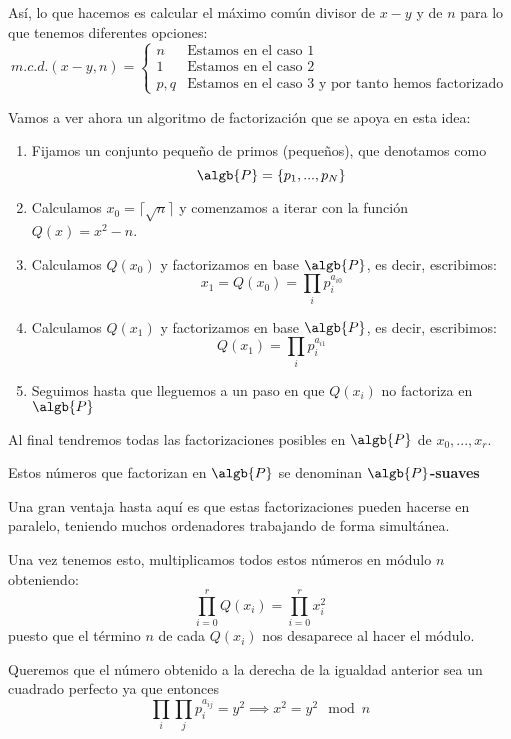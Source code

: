 Así, lo que hacemos es calcular el máximo común divisor de $x-y$ y de $n$ para lo que tenemos diferentes opciones:
\[m.c.d.(x-y,n) = \left\{ \begin{array}{ll}
             n &   \text{Estamos en el caso 1} \\
             1 &   \text{Estamos en el caso 2}\\
             p,q & \text{Estamos en el caso 3 y por tanto hemos factorizado}
             \end{array}\right.\]


Vamos a ver ahora un algoritmo de factorización que se apoya en esta idea:
\begin{mdframed}
\begin{enumerate}
\item Fijamos un conjunto pequeño de primos (pequeños), que denotamos como
\[\algb{P} = \{p_1,...,p_N\}\]

\item Calculamos $x_0=\lceil\sqrt{n}\rceil$ y comenzamos a iterar con la función $Q(x)=x^2-n$.

\item Calculamos $Q(x_0)$ y factorizamos en base $\algb{P}$, es decir, escribimos:
\[x_1 = Q(x_0) = \prod_i p_i^{a_{i0}}\]

\item Calculamos $Q(x_1)$ y factorizamos en base $\algb{P}$, es decir, escribimos:
\[Q(x_1) = \prod_i p_i^{a_{i1}}\]

\item Seguimos hasta que lleguemos a un paso en que $Q(x_i)$ no factoriza en $\algb{P}$
\end{enumerate}

Al final tendremos todas las factorizaciones posibles en $\algb{P}$ de $x_0,...,x_r$.

Estos números que factorizan en $\algb{P}$ se denominan \textbf{$\algb{P}$-suaves}

\obs Una gran ventaja hasta aquí es que estas factorizaciones pueden hacerse en paralelo, teniendo muchos ordenadores trabajando de forma simultánea.

Una vez tenemos esto, multiplicamos todos estos números en módulo $n$ obteniendo:
\[\prod_{i=0}^rQ(x_i)=\prod_{i=0}^rx_i^2\]
puesto que el término $n$ de cada $Q(x_i)$ nos desaparece al hacer el módulo.

Queremos que el número obtenido a la derecha de la igualdad anterior sea un cuadrado perfecto ya que entonces
\[\prod_i\prod_jp_i^{a_{ij}} = y^2 \implies x^2 = y^2 \mod n\]


\end{mdframed}
